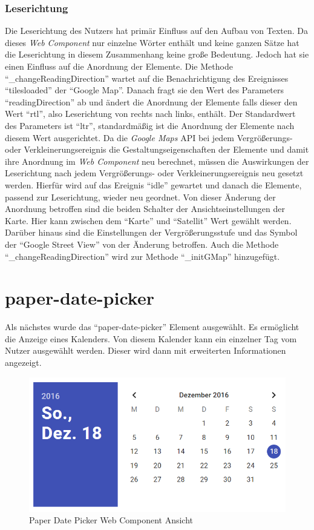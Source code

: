 \documentclass[12pt, paper=a4, bibtotoc, toc=listof, headsepline=true]{scrreprt}
\begin{document}
		\subsubsection{Leserichtung}
		Die Leserichtung des Nutzers hat primär Einfluss auf den Aufbau von Texten. Da dieses \emph{Web Component} nur einzelne Wörter enthält und keine ganzen Sätze hat die Leserichtung in diesem Zusammenhang keine große Bedeutung. Jedoch hat sie einen Einfluss auf die Anordnung der Elemente. Die Methode \enquote{\_changeReadingDirection} wartet auf die Benachrichtigung des Ereignisses \enquote{tilesloaded} der \enquote{Google Map}. Danach fragt sie den Wert des Parameters \enquote{readingDirection} ab und ändert die Anordnung der Elemente falls dieser den Wert \enquote{rtl}, also Leserichtung von rechts nach links, enthält. Der Standardwert des Parameters ist \enquote{ltr}, standardmäßig ist die Anordnung der Elemente nach diesem Wert ausgerichtet. Da die \emph{Google Maps} \ac{API} bei jedem Vergrößerungs- oder Verkleinerungsereignis die Gestaltungseigenschaften der Elemente und damit ihre Anordnung im \emph{Web Component} neu berechnet, müssen die Auswirkungen der Leserichtung nach jedem Vergrößerungs- oder Verkleinerungsereignis neu gesetzt werden. Hierfür wird auf das Ereignis \enquote{idle} gewartet und danach die Elemente, passend zur Leserichtung, wieder neu geordnet. Von dieser Änderung der Anordnung betroffen sind die beiden Schalter der Ansichtseinstellungen der Karte. Hier kann zwischen dem \enquote{Karte} und \enquote{Satellit} Wert gewählt werden. Darüber hinaus sind die Einstellungen der Vergrößerungsstufe und das Symbol der \enquote{Google Street View} von der Änderung betroffen. Auch die Methode \enquote{\_changeReadingDirection} wird zur Methode \enquote{\_initGMap} hinzugefügt.
		\newpage
	\section{paper-date-picker}
		Als nächstes wurde das \enquote{paper-date-picker} Element ausgewählt.\cite{datPic} Es ermöglicht die Anzeige eines Kalenders. Von diesem Kalender kann ein einzelner Tag vom Nutzer ausgewählt werden. Dieser wird dann mit erweiterten Informationen angezeigt.
		\begin{figure}[H]		
			\centering
			\includegraphics[width=\textwidth,height=\textheight,keepaspectratio]{datPic.png}
			\caption[Paper Date Picker]{Paper Date Picker Web Component Ansicht}
			\label{img:datPic}
		\end{figure}
\end{document}
